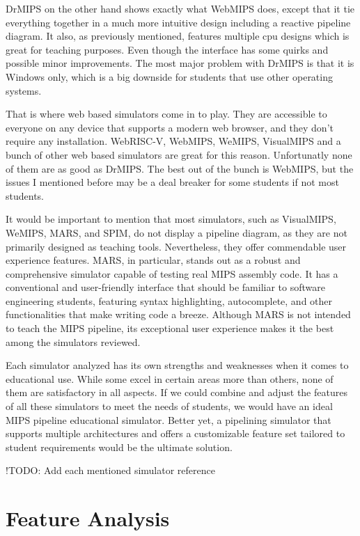 DrMIPS on the other hand shows exactly what WebMIPS does, except that it tie everything together in a much more intuitive design including a reactive pipeline diagram. It also, as previously mentioned, features multiple cpu designs which is great for teaching purposes. Even though the interface has some quirks and possible minor improvements. The most major problem with DrMIPS is that it is Windows only, which is a big downside for students that use other operating systems.

That is where web based simulators come in to play. They are accessible to everyone on any device that supports a modern web browser, and they don't require any installation. WebRISC-V, WebMIPS, WeMIPS, VisualMIPS and a bunch of other web based simulators are great for this reason. Unfortunatly none of them are as good as DrMIPS. The best out of the bunch is WebMIPS, but the issues I mentioned before may be a deal breaker for some students if not most students.

It would be important to mention that most simulators, such as VisualMIPS, WeMIPS, MARS, and SPIM, do not display a pipeline diagram, as they are not primarily designed as teaching tools. Nevertheless, they offer commendable user experience features. MARS, in particular, stands out as a robust and comprehensive simulator capable of testing real MIPS assembly code. It has a conventional and user-friendly interface that should be familiar to software engineering students, featuring syntax highlighting, autocomplete, and other functionalities that make writing code a breeze. Although MARS is not intended to teach the MIPS pipeline, its exceptional user experience makes it the best among the simulators reviewed.

Each simulator analyzed has its own strengths and weaknesses when it comes to educational use. While some excel in certain areas more than others, none of them are satisfactory in all aspects. If we could combine and adjust the features of all these simulators to meet the needs of students, we would have an ideal MIPS pipeline educational simulator. Better yet, a pipelining simulator that supports multiple architectures and offers a customizable feature set tailored to student requirements would be the ultimate solution.

!TODO: Add each mentioned simulator reference

\section{Feature Analysis}\label{sec:feature_comparison}

